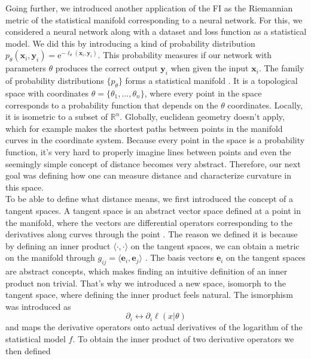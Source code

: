 Going further, we introduced another application of the FI as the Riemannian metric of the statistical manifold corresponding to a neural network. For this, we considered a neural network along with a dataset and loss function as a statistical model. We did this by introducing a kind of probability distribution $p_\theta(\mathbf{x}_i,\mathbf{y}_i) = \mathrm{e}^{-\ell_\theta(\mathbf{x}_i,\mathbf{y}_i)}$. This probability measures if our network with parameters $\theta$ produces the correct output $\mathbf{y}_i$ when given the input $\mathbf{x}_i$. The family of probability distributions $\{p_\theta\}$ forms a statistical manifold \cite{AmarisLectureNotes}. It is a topological space with coordinates $\theta = \{\theta_1, \ldots, \theta_n\}$, where every point in the space corresponds to a probability function that depends on the $\theta$ coordinates. Locally, it is isometric to a subset of $\mathbb{R}^n$. Globally, euclidean geometry doesn't apply, which for example makes the shortest paths between points in the manifold curves in the coordinate system. Because every point in the space is a probability function, it's very hard to properly imagine lines between points and even the seemingly simple concept of distance becomes very abstract. Therefore, our next goal was defining how one can measure distance and characterize curvature in this space.\\
To be able to define what distance means, we first introduced the concept of a tangent spaces. A tangent space is an abstract vector space defined at a point in the manifold, where the vectors are differential operators corresponding to the derivatives along curves through the point \cite{AmarisLectureNotes}. The reason we defined it is because by defining an inner product $\langle \cdot , \cdot \rangle$ on the tangent spaces, we can obtain a metric on the manifold through $g_{ij} = \langle \mathbf{e}_i,\mathbf{e}_j\rangle$ \cite{AmarisLectureNotes}. The basis vectors $\mathbf{e}_i$ on the tangent spaces are abstract concepts, which makes finding an intuitive definition of an inner product non trivial. That's why we introduced a new space, isomorph to the tangent space, where defining the inner product feels natural. The ismorphism was introduced as \cite{AmarisLectureNotes}
\begin{equation}
	\partial_i \leftrightarrow \partial_i \ell(x|\theta)
\end{equation}
and maps the derivative operators onto actual derivatives of the logarithm of the statistical model $f$. To obtain the inner product of two derivative operators we then defined \cite{AmarisLectureNotes}
